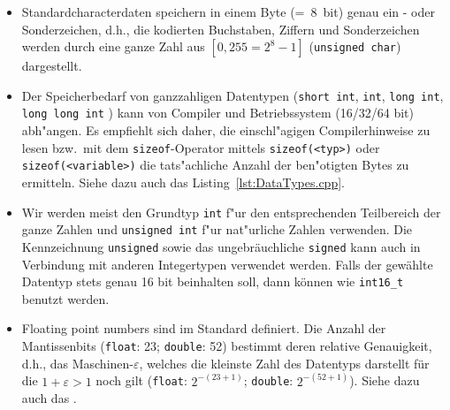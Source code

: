 %
\begin{itemize}
 \item Standardcharacterdaten speichern in einem Byte (=~8~bit) genau ein
  - oder Sonderzeichen, d.h.,
  die kodierten Buchstaben, Ziffern und Sonderzeichen werden durch eine ganze Zahl aus $[0,255=2^{8}-1]$
  (\texttt{unsigned char}) dargestellt. 
 \item Der Speicherbedarf von ganzzahligen Datentypen (\texttt{short int}, \texttt{int},
 \texttt{long int}, \texttt{long long int} )
 	kann von Compiler und Betriebssystem (16/32/64 bit) abh"angen.
	Es empfiehlt sich daher, die einschl"agigen Compilerhinweise zu lesen
	bzw.\  mit dem \texttt{sizeof}-Operator mittels
	\texttt{sizeof(<typ>)} oder \texttt{sizeof(<variable>)}
	die tats"achliche Anzahl der ben"otigten Bytes zu ermitteln.
	Siehe dazu auch das Listing~\ref{lst:DataTypes.cpp}.
 \item Wir werden meist den Grundtyp \texttt{int} f"ur
 	den entsprechenden Teilbereich der ganze Zahlen und
 	\texttt{unsigned int} f"ur nat"urliche Zahlen verwenden.
	Die Kennzeichnung \texttt{unsigned} sowie das ungebräuchliche \texttt{signed} kann auch in
	Verbindung mit anderen Integertypen verwendet werden.
    Falls der gewählte Datentyp stets genau 16 bit beinhalten soll, dann können 
     wie \verb|int16_t| benutzt werden.
 \item Floating point numbers sind im Standard  definiert.
 Die Anzahl der Mantissenbits (\texttt{float}: 23; \texttt{double}: 52) bestimmt deren relative Genauigkeit,
  d.h., das Maschinen-$\varepsilon$, welches die kleinste Zahl des Datentyps darstellt
  für die $1+\varepsilon > 1$ noch gilt
  (\texttt{float}: $2^{-(23+1)}$; \texttt{double}: $2^{-(52+1)}$).
  Siehe dazu auch das .
\end{itemize}
%
%
%
